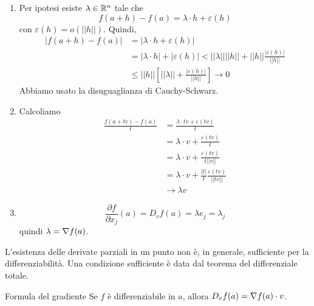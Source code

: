 \documentclass[a4paper]{article}
\begin{document}
\begin{radioactive}
\begin{snippetproof}{}
    \begin{enumerate}
        \item Per ipotesi esiste \(\lambda \in \mathbb{R}^n\)
        tale che
        \[
            f(a + h) - f(a) = \lambda \cdot h + \varepsilon(h)
        \]
        con \(\varepsilon(h) = o(||h||)\).
        Quindi, \begin{align*}
            |f(a+h) - f(a)| &= 
            |\lambda \cdot h + \varepsilon(h)| \\
            &= |\lambda \cdot h| + |\varepsilon(h)| < ||\lambda||
            ||h|| + ||h|| \frac{|\varepsilon(h)|}{||h||} \\
            &\leq ||h|| \left[
                ||\lambda|| + \frac{|\varepsilon(h)|}{||h||}
            \right] \to 0
        \end{align*}
        Abbiamo usato la disuguaglianza di Cauchy-Schwarz.
        \item Calcoliamo
        \begin{align*}
            \frac{f(a + tv) - f(a)}t
            &= \frac{\lambda \cdot tv + \varepsilon(tv)}{t} \\
            &= \lambda \cdot v + \frac{\varepsilon(tv)}{t} \\
            &= \lambda \cdot v + \frac{\varepsilon(tv)}{t ||v||} \\
            &= \lambda \cdot v + \frac{|t|}{t} \frac{\varepsilon(tv)}{||tv||} \\
            &\to \lambda v
        \end{align*}
        \item \[
            \frac{\partial f}{\partial x_j}(a)
            = D_v f(a) = \lambda e_j = \lambda_j
        \]
        quindi \(\lambda = \nabla f(a)\).
    \end{enumerate}
\end{snippetproof}
\end{radioactive}

\begin{radioactive}
L'esistenza delle derivate parziali in un punto non è, in generale, sufficiente per la differenziabilità.
Una condizione sufficiente è data dal teorema del differenziale totale.

\begin{snippetcorollary}{Formula del gradiente}
    Se \(f\) è differenziabile in \(a\),
    allora \(D_v f(a) = \nabla f(a) \cdot v\).
\end{snippetcorollary}
\end{radioactive}
\end{document}
